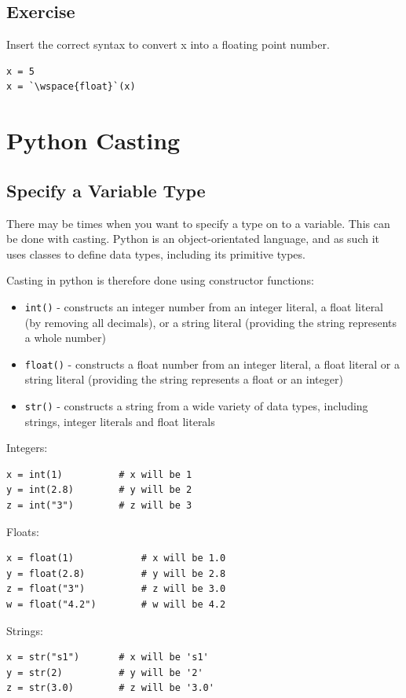 \documentclass[12pt,a4paper]{article}
\newcommand{\wspace}[1]{%
	\color{white}\colorbox{white}{\texttt{#1}}%
}
\newcommand{\code}[1]{%
	\colorbox{backcolour}{\lstinline{#1}}%
}
\begin{document}
\subsection{Exercise}
\begin{tbox}
Insert the correct syntax to convert x into a floating point number.

\begin{lstlisting}[numbers=none]
x = 5
x = `\wspace{float}`(x)
\end{lstlisting}
\end{tbox}
\vfill\newpage
\section{Python Casting}
\subsection{Specify a Variable Type}
There may be times when you want to specify a type on to a variable. This can
be done with casting. Python is an object-orientated language, and as such it
uses classes to define data types, including its primitive types.

Casting in python is therefore done using constructor functions:

\begin{itemize}
	\item \code{int()} - constructs an integer number from an integer literal,
		a float literal (by removing all decimals), or a string literal
		(providing the string represents a whole number)
	\item \code{float()} - constructs a float number from an integer literal, a
		float literal or a string literal (providing the string represents a
		float or an integer)
	\item \code{str()} - constructs a string from a wide variety of data types,
		including strings, integer literals and float literals
\end{itemize}

\begin{ebox}
	Integers:
	\begin{lstlisting}
x = int(1)			# x will be 1
y = int(2.8)		# y will be 2
z = int("3")		# z will be 3
	\end{lstlisting}

	Floats:
	\begin{lstlisting}
x = float(1)			# x will be 1.0
y = float(2.8)			# y will be 2.8
z = float("3")			# z will be 3.0
w = float("4.2")		# w will be 4.2
	\end{lstlisting}

	Strings:
	\begin{lstlisting}
x = str("s1")		# x will be 's1'
y = str(2)			# y will be '2'
z = str(3.0)		# z will be '3.0'
	\end{lstlisting}

\end{ebox}
\vfill\newpage
\end{document}

